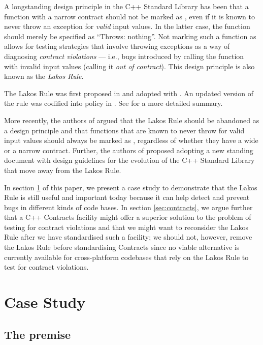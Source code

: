 A longstanding design principle in the C++ Standard Library has been that a function with a narrow contract should not be marked as , even if it is known to never throw an exception for \emph{valid} input values. In the latter case, the function should merely be specified as ``Throws: nothing''. Not marking such a function as  allows for testing strategies that involve throwing exceptions as a way of diagnosing \emph{contract violations} --- i.e., bugs introduced by calling the function with invalid input values (calling it \emph{out of contract}). This design principle is also known as the \emph{Lakos Rule}.

The Lakos Rule was first proposed in \cite{N3248} and adopted with \cite{N3279}. An updated version of the rule was codified into policy in \cite{P0884R0}. See \cite{O'Dwyer2018} for a more detailed summary.

More recently, the authors of \cite{P1656R2} argued that the Lakos Rule should be abandoned as a design principle and that functions that are known to never throw for valid input values should always be marked as , regardless of whether they have a wide or a narrow contract. Further, the authors of \cite{P2148R0} proposed adopting a new standing document with design guidelines for the evolution of the C++ Standard Library that move away from the Lakos Rule.

In section \ref{sec:casestudy} of this paper, we present a case study to demonstrate that the Lakos Rule is still useful and important today because it can help detect and prevent bugs in different kinds of code bases. In section \ref{sec:contracts}, we argue further that a C++ Contracts facility might offer a superior solution to the problem of testing for contract violations and that we might want to reconsider the Lakos Rule after we have standardised such a facility; we should not, however, remove the Lakos Rule before standardising Contracts since no viable alternative is currently available for cross-platform codebases that rely on the Lakos Rule to test for contract violations.

\section{Case Study}
\label{sec:casestudy}

\subsection{The premise}

